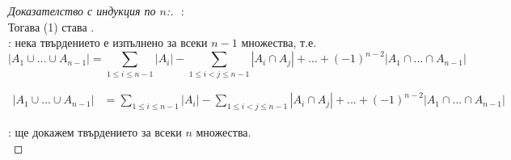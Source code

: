 \begin{proof}[Доказателство с индукция по \(n\):]
    $ $\newline
    :  \\
    Тогава (1) става . \\

    : нека твърдението е изпълнено за всеки \(n - 1\) множества, т.е.
    \begin{equation}
        |A_1 \cup ... \cup A_{n - 1}| = \sum_{1 \le i \le n - 1} |A_i| - \sum_{1 \le i < j \le n - 1} |A_i \cap A_j| 
        + ... + (-1)^{n - 2}|A_1 \cap ... \cap A_{n - 1}|
    \end{equation}

    \begin{align*}
        |A_1 \cup ... \cup A_{n - 1}| &= \sum_{1 \le i \le n - 1} |A_i| - \sum_{1 \le i < j \le n - 1} |A_i \cap A_j| 
        + ... + (-1)^{n - 2}|A_1 \cap ... \cap A_{n - 1}|
    \end{align*}

    : ще докажем твърдението за всеки \(n\) множества. \\

\end{proof}